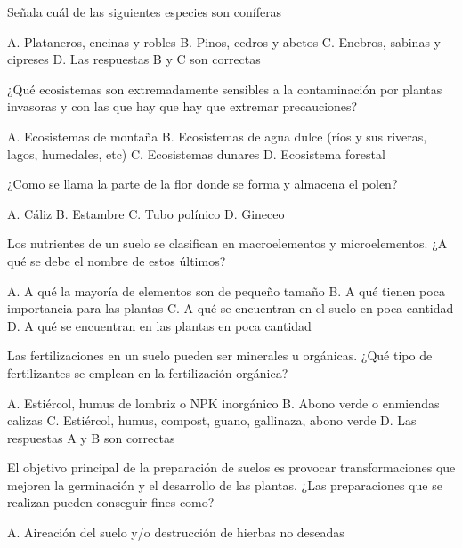 \documentclass[11pt]{exam}
\begin{document}
{\begin{questions}
\question Señala cuál de las siguientes especies son coníferas
\begin{checkboxes}
  \choice A. Plataneros, encinas y robles
  \choice B. Pinos, cedros y abetos
  \choice C. Enebros, sabinas y cipreses
  \CorrectChoice D. Las respuestas B y C son correctas
\end{checkboxes}
\question ¿Qué ecosistemas son extremadamente sensibles a la contaminación por
  plantas invasoras y con las que hay que hay que extremar precauciones?
  \begin{checkboxes}
    \choice A. Ecosistemas de montaña
    \CorrectChoice B. Ecosistemas de agua dulce (ríos y sus
    riveras, lagos, humedales, etc)
    \choice C. Ecosistemas dunares
    \choice D. Ecosistema forestal
  \end{checkboxes}
\question ¿Como se llama la parte de la flor donde se forma y almacena el polen?
  \begin{checkboxes}
    \choice A. Cáliz
    \CorrectChoice B. Estambre
    \choice C. Tubo polínico
    \choice D. Gineceo
  \end{checkboxes}
\question Los nutrientes de un suelo se clasifican en macroelementos y microelementos. ¿A
  qué se debe el nombre de estos últimos?
  \begin{checkboxes}
    \choice A. A qué la mayoría de elementos son de pequeño tamaño
    \choice B. A qué tienen poca importancia para las plantas
    \choice C. A qué se encuentran en el suelo en poca cantidad
    \CorrectChoice D. A qué se encuentran en las plantas en poca cantidad 
  \end{checkboxes}
  \newpage
\question Las fertilizaciones en un suelo pueden ser minerales u orgánicas. ¿Qué tipo
  de fertilizantes se emplean en la fertilización orgánica?
  \begin{checkboxes}
    \choice A. Estiércol, humus de lombriz o NPK inorgánico
    \choice B. Abono verde  o enmiendas calizas
    \CorrectChoice C. Estiércol, humus, compost, guano, gallinaza, abono verde
    \choice D. Las respuestas A y B son correctas
  \end{checkboxes}
\question El objetivo principal de la preparación de suelos es provocar transformaciones
  que mejoren la germinación y el desarrollo de las plantas. ¿Las preparaciones que se
  realizan pueden conseguir fines como?
  \begin{checkboxes}
    \choice A. Aireación del suelo y/o destrucción de hierbas no deseadas

\end{checkboxes}
\end{questions}}
\end{document}
